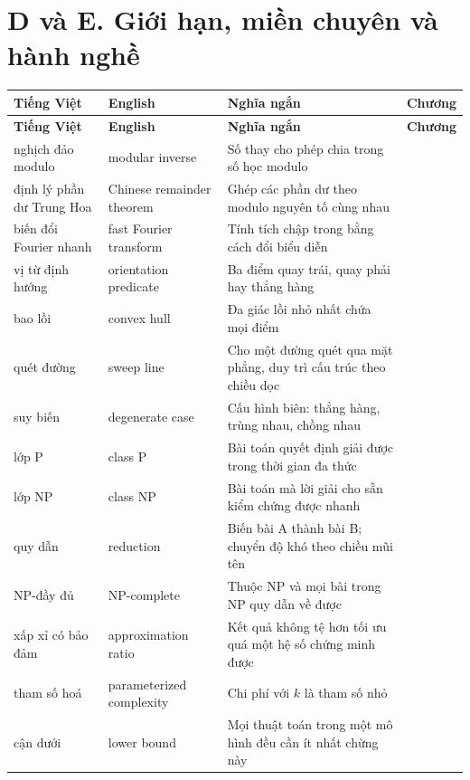 \documentclass[algorithm.tex]{subfiles}
\begin{document}
\section*{D và E. Giới hạn, miền chuyên và hành nghề}
\begin{center}\footnotesize
{}
\begin{longtable}{@{}L{3.5cm}L{3.9cm}L{6.2cm}L{1.5cm}@{}}
\toprule
\textbf{Tiếng Việt} & \textbf{English} & \textbf{Nghĩa ngắn} & \textbf{Chương}\\
\midrule
\endfirsthead
\toprule
\textbf{Tiếng Việt} & \textbf{English} & \textbf{Nghĩa ngắn} & \textbf{Chương}\\
\midrule
\endhead
nghịch đảo modulo & modular inverse & Số thay cho phép chia trong số học modulo & \\
định lý phần dư Trung Hoa & Chinese remainder theorem & Ghép các phần dư theo modulo nguyên tố cùng nhau & \\
biến đổi Fourier nhanh & fast Fourier transform & Tính tích chập trong  bằng cách đổi biểu diễn & \\
vị từ định hướng & orientation predicate & Ba điểm quay trái, quay phải hay thẳng hàng & \\
bao lồi & convex hull & Đa giác lồi nhỏ nhất chứa mọi điểm & \\
quét đường & sweep line & Cho một đường quét qua mặt phẳng, duy trì cấu trúc theo chiều dọc & \\
suy biến & degenerate case & Cấu hình biên: thẳng hàng, trùng nhau, chồng nhau & \\
lớp P & class P & Bài toán quyết định giải được trong thời gian đa thức & \\
lớp NP & class NP & Bài toán mà lời giải cho sẵn kiểm chứng được nhanh & \\
quy dẫn & reduction & Biến bài A thành bài B; chuyển độ khó theo chiều mũi tên & \\
NP-đầy đủ & NP-complete & Thuộc NP và mọi bài trong NP quy dẫn về được & \\
xấp xỉ có bảo đảm & approximation ratio & Kết quả không tệ hơn tối ưu quá một hệ số chứng minh được & \\
tham số hoá & parameterized complexity & Chi phí  với \(k\) là tham số nhỏ & \\
cận dưới & lower bound & Mọi thuật toán trong một mô hình đều cần ít nhất chừng này & \\

\end{longtable}
\end{center}
\end{document}
